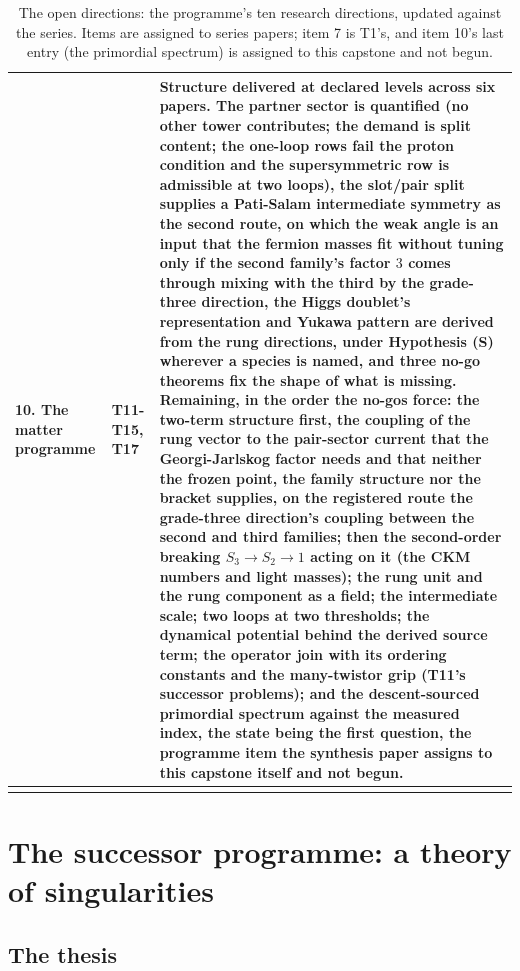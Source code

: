 \documentclass[11pt]{article}
\theoremstyle{definition}
\begin{document}
\begin{longtable}{p{} p{} p{}}
10. The matter programme & T11-T15, T17 & Structure delivered at declared levels across six papers. The partner sector is quantified (no other tower contributes; the demand is split content; the one-loop rows fail the proton condition and the supersymmetric row is admissible at two loops), the slot/pair split supplies a Pati-Salam intermediate symmetry as the second route, on which the weak angle is an input that the fermion masses fit without tuning only if the second family's factor $3$ comes through mixing with the third by the grade-three direction, the Higgs doublet's representation and Yukawa pattern are derived from the rung directions, under Hypothesis (S) wherever a species is named, and three no-go theorems fix the shape of what is missing. Remaining, in the order the no-gos force: the two-term structure first, the coupling of the rung vector to the pair-sector current that the Georgi-Jarlskog factor needs and that neither the frozen point, the family structure nor the bracket supplies, on the registered route the grade-three direction's coupling between the second and third families; then the second-order breaking $S_{3} \to S_{2} \to 1$ acting on it (the CKM numbers and light masses); the rung unit and the rung component as a field; the intermediate scale; two loops at two thresholds; the dynamical potential behind the derived source term; the operator join with its ordering constants and the many-twistor grip (T11's successor problems); and the descent-sourced primordial spectrum against the measured index, the state being the first question, the programme item the synthesis paper assigns to this capstone itself and not begun. \\
\bottomrule
\caption{The open directions: the programme's ten research directions, updated against the series. Items are assigned to series papers; item 7 is T1's, and item 10's last entry (the primordial spectrum) is assigned to this capstone and not begun.}
\label{tab:directions}
\end{longtable}
\endgroup

\section{The successor programme: a theory of singularities}\label{sec:thesis}

\subsection{The thesis}
\end{document}
